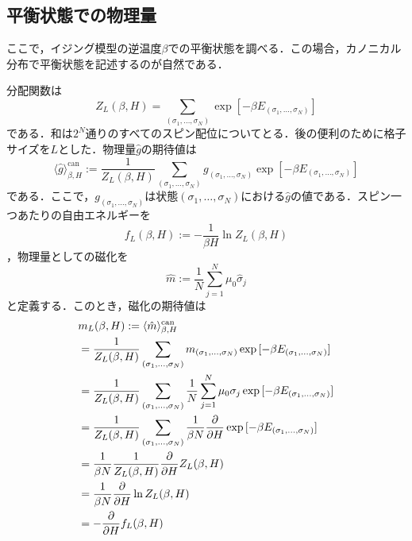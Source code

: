 \documentclass[a4paper,11pt]{jsreport}
\begin{document}
\subsection{平衡状態での物理量}
ここで，イジング模型の逆温度$\beta$での平衡状態を調べる．この場合，カノニカル分布で平衡状態を記述するのが自然である．\par
分配関数は
\begin{equation}
  Z_L(\beta, H) = \sum_{(\sigma_1,\dots,\sigma_N)} \exp{[-\beta E_{(\sigma_1,\dots,\sigma_N)}]} \label{イジング分配関数}
\end{equation}
である．和は$2^N$通りのすべてのスピン配位についてとる．後の便利のために格子サイズを$L$とした．物理量$\hat{g}$の期待値は
\begin{equation}
  \langle \hat{g} \rangle_{\beta, H}^{\text{can}}
  := \frac{1}{Z_L(\beta, H)}  \sum_{(\sigma_1,\dots,\sigma_N)} g_{(\sigma_1,\dots,\sigma_N)} \exp{[-\beta E_{(\sigma_1,\dots,\sigma_N)}]}
\end{equation}
である．ここで，$g_{(\sigma_1,\dots,\sigma_N)}$は状態$(\sigma_1,\dots,\sigma_N)$における$\hat{g}$の値である．スピン一つあたりの自由エネルギーを
\begin{equation}
  f_L(\beta, H) := -\frac{1}{\beta H} \ln{Z_L(\beta, H)} \label{自由エネルギー}
\end{equation}
，物理量としての磁化を
\begin{equation}
  \hat{m} := \frac{1}{N} \sum_{j=1}^{N} \mu_0 \hat{\sigma}_j
\end{equation}
と定義する．このとき，磁化の期待値は
\begin{align}
   & m_L(\beta, H) := \langle \hat{m} \rangle_{\beta, H}^{\text{can}} \notag                                                                                       \\
   & = \frac{1}{Z_L(\beta, H)} \sum_{(\sigma_1, \dots, \sigma_N)} m_{(\sigma_1,\dots,\sigma_N)} \exp{[-\beta E_{(\sigma_1,\dots,\sigma_N)}]} \notag                \\
   & = \frac{1}{Z_L(\beta, H)} \sum_{(\sigma_1, \dots, \sigma_N)} \frac{1}{N} \sum_{j=1}^N \mu_0 \sigma_j \exp{[-\beta E_{(\sigma_1,\dots,\sigma_N)}]} \notag      \\
   & = \frac{1}{Z_L(\beta, H)} \sum_{(\sigma_1, \dots, \sigma_N)} \frac{1}{\beta N} \frac{\partial}{\partial H} \exp{[-\beta E_{(\sigma_1,\dots,\sigma_N)}]}\notag \\
   & = \frac{1}{\beta N} \frac{1}{Z_L(\beta, H)} \frac{\partial}{\partial H} Z_L(\beta, H)  \notag                                                                 \\
   & = \frac{1}{\beta N}\frac{\partial}{\partial H} \ln{Z_L (\beta, H)} \notag                                                                                     \\
   & = -\frac{\partial}{\partial H} f_L(\beta, H) \label{磁化と自由エネルギーの関係式}
\end{align}
\end{document}
